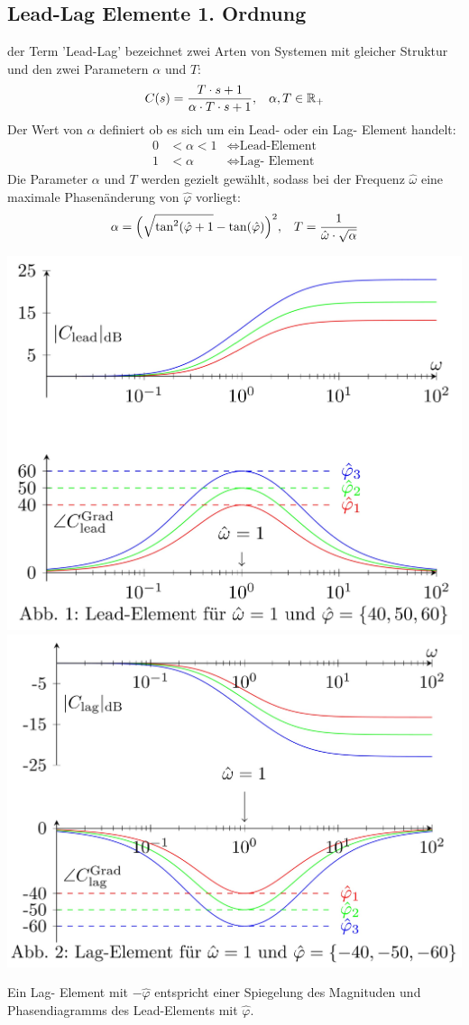     \subsection{Lead-Lag Elemente 1. Ordnung}
        der Term 'Lead-Lag' bezeichnet zwei Arten von Systemen mit gleicher Struktur und den zwei Parametern $\alpha$ und $T$:
        \[
        C(s) = \frac{T\cdot s + 1}{\alpha \cdot T \cdot s + 1}, \hspace{3mm} \alpha,T\in \mathbb{R}_+
        \]
        Der Wert von $\alpha$ definiert ob es sich um ein Lead- oder ein Lag- Element handelt: 
        \begin{align*}
            0 &< \alpha < 1 & \Leftrightarrow \textrm{Lead-Element} \\
            1 &< \alpha     & \Leftrightarrow \textrm{Lag- Element}
        \end{align*}
        Die Parameter $\alpha$ und $T$ werden gezielt gewählt, sodass bei der Frequenz $\hat{\omega}$ eine maximale Phasenänderung von $\hat{\varphi}$ vorliegt:
        \[\alpha = \Big(\sqrt{\tan^2(\hat{\varphi}+1}-\tan(\hat{\varphi})\Big)^2, \hspace{3mm} T = \frac{1}{\hat{\omega}\cdot\sqrt{\alpha }}\]
        \begin{center}
            \includegraphics[width = 0.85\linewidth]{images/09/Lead_Lag_pos.jpg}
            \includegraphics[width = 0.8\linewidth]{images/09/Lead_Lag_neg.jpg}
        \end{center}
        Ein Lag- Element mit $-\hat{\varphi}$ entspricht einer Spiegelung des Magnituden und Phasendiagramms des Lead-Elements mit $\hat{\varphi}$.

